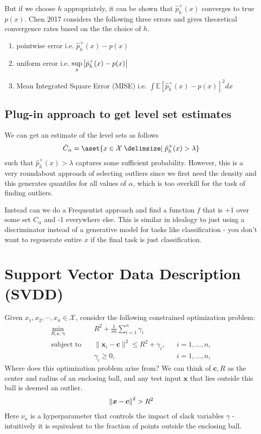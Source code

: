 \documentclass[11pt]{report}
\begin{document}
But if we choose $h$ appropriately, it can be shown that $\hat{p}_h^+(x)$ converges to true $p(x)$. Chen 2017 \cite{Chen2017-ns} considers the following three errors and gives theoretical convergence rates based on the the choice of $h$. \begin{enumerate}
    \item pointwise error i.e. $\hat{p}_h^+(x) - p(x)$
    \item uniform error i.e. $\sup\limits_x \left\lvert{\hat{p}_h^+(x) - p(x)}\right\rvert$ 
    \item Mean Integrated Square Error (MISE) i.e. $\int \mathbb{E}\left[\hat{p}_h^+(x) - p(x)\right]^2dx$
\end{enumerate} 

\subsection{Plug-in approach to get level set estimates}
We can get an estimate of the level sets as follows 
\begin{align}
    \hat{C}_\alpha = \aset{x \in \mathcal{X} \suchthat \hat{p}_h^+(x) > \lambda}
\end{align} such that $\hat{p}_h^+(x) > \lambda$ captures some sufficient probability. However, this is a very roundabout approach of selecting outliers since we first need the density and this generates quantiles for all values of $\alpha$, which is too overkill for the task of finding outliers. 

Instead can we do a Frequentist approach and find a function $f$ that is +1 over some set $C_\alpha$ and -1 everywhere else. This is similar in idealogy to just using a discriminator instead of a generative model for tasks like classification - you don't want to regenerate entire $x$ if the final task is just classification.

\section{Support Vector Data Description (SVDD)}
Given $x_1, x_2, \cdots, x_n \in \mathcal{X}$, consider the following constrained optimization problem:
\begin{align}
\min_{R, \mathbf{c}, \boldsymbol{\gamma}} \quad & R^2 + \frac{1}{\nu n} \sum_{i=1}^{n} \gamma_i \\
\text{subject to} \quad & \|\mathbf{x}_i - \mathbf{c} \|^2 \leq R^2 + \gamma_i, 
&& i = 1, \ldots, n, \label{svdd-const1} \\
& \gamma_i \geq 0, 
&& i = 1, \ldots, n, \label{svdd-const2}
\end{align}
 Where does this optimization problem arise from? We can think of $\boldsymbol{c}, R$ as the center and radius of an enclosing ball, and any test input $\boldsymbol{x}$ that lies outside this ball is deemed an outlier. 
$$\left\lVert \boldsymbol{x} - \boldsymbol{c} \right\rVert^2 > R^2$$
Here $\nu_n$ is a hyperparameter that controls the impact of slack variables $\gamma$ - intuitively it is equivalent to the fraction of points outside the enclosing ball. 
\end{document}

